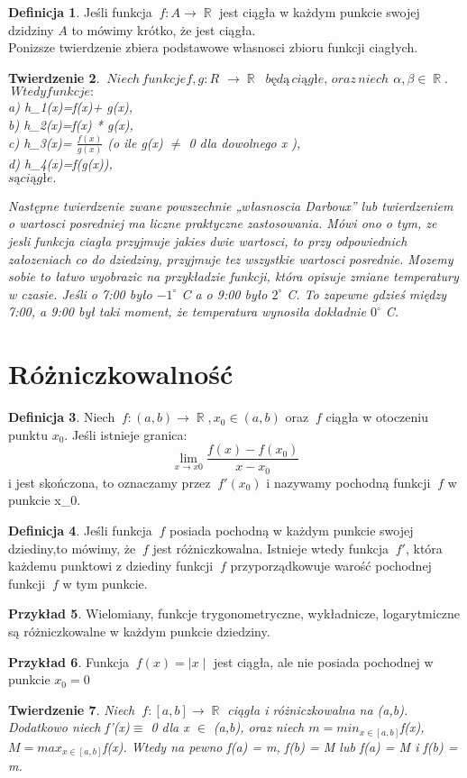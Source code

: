\documentclass[12pt,a4paper]{article}
\newtheorem{tw}{Twierdzenie}[section]
\theoremstyle{definition}
\newtheorem{df}[tw]{Definicja}
\newtheorem{ex}[tw]{Przykład}
\DeclareMathOperator{\R}{\mathbb{R}}
\begin{document}
\begin{df} Jeśli funkcja $\ f: A\rightarrow\R$ jest ciągła w każdym punkcie swojej dzidziny $ A$ to mówimy krótko, że jest ciągła.
\\Ponizsze twierdzenie zbiera podstawowe własnosci zbioru funkcji ciagłych.
\end{df}
\begin{tw} $ \ Niech\,funkcje  f,g: R$ $ \rightarrow\R$ $ \ będą\,ciągłe,\,oraz\,niech$ $ \alpha,\beta\in\R.$ $ \ Wtedy funkcje: $
\\a) h_1(x)=\alpha * f(x)+ \beta * g(x),
\\b) h_2(x)=f(x) * g(x),
\\c) h_3(x)=  $ \frac{f(x)}{g(x)} $ (o ile g(x) $\neq$ 0 dla dowolnego x \in \R),
\\d) h_4(x)=f(g(x)),  
\\$ są ciągłe. $

Następne twierdzenie zwane powszechnie „własnoscia Darboux” lub twierdzeniem
o wartosci posredniej ma liczne praktyczne zastosowania. Mówi ono o tym,
ze jesli funkcja ciagła przyjmuje jakies dwie wartosci, to przy odpowiednich załozeniach
co do dziedziny, przyjmuje tez wszystkie wartosci posrednie. Mozemy sobie to
łatwo wyobrazic na przykładzie funkcji, która opisuje zmiane temperatury w czasie. Jeśli o 7:00 było $-1^{\circ}$ C a o 9:00 było $2^{\circ}$ C. To zapewne gdzieś między 7:00, a 9:00 był taki moment, że temperatura wynosiła dokładnie $0^{\circ}$ C.


\end{tw}
\section{Różniczkowalność}
\begin{df}
Niech $\ f : (a,b)\rightarrow \R,x_0 \in(a,b)$ oraz $\ f$ ciągła w otoczeniu punktu $x_0$. Jeśli istnieje granica:
$$\lim_{x\rightarrow x0}\frac{f(x)-f(x_0)}{x-x_0}$$
i jest skończona, to oznaczamy przez $\ f'(x_0)$ i nazywamy pochodną funkcji $\ f$ w punkcie x_0.
\end{df}
\begin{df}
Jeśli funkcja $\ f$ posiada pochodną w każdym punkcie swojej dziediny,to mówimy, że $\ f$ jest różniczkowalna. Istnieje wtedy funkcja $\ f'$, która każdemu punktowi z dziediny funkcji $\ f$ przyporządkowuje warość pochodnej funkcji $\ f$ w tym punkcie.
\end{df}
\begin{ex}
Wielomiany, funkcje trygonometryczne, wykładnicze, logarytmiczne są różniczkowalne w każdym punkcie dziedziny.
\end{ex}
\begin{ex}
Funkcja $\ f(x) =\mid x \mid$ jest ciągła, ale nie posiada pochodnej w punkcie $ x_0=0$
\end{ex}
\begin{tw}
Niech $\ f:[a,b]\rightarrow\R$ ciągła i różniczkowalna na (a,b). Dodatkowo niech f'(x)$\equiv$ 0 dla x $\in$ (a,b), oraz niech $m=min_{x\in[a,b]}$f(x), $M = max_{x\in[a,b]}$f(x). Wtedy na pewno f(a) = m, f(b) = M lub f(a) = M i f(b) = m.
\end{tw}  
\end{document}
